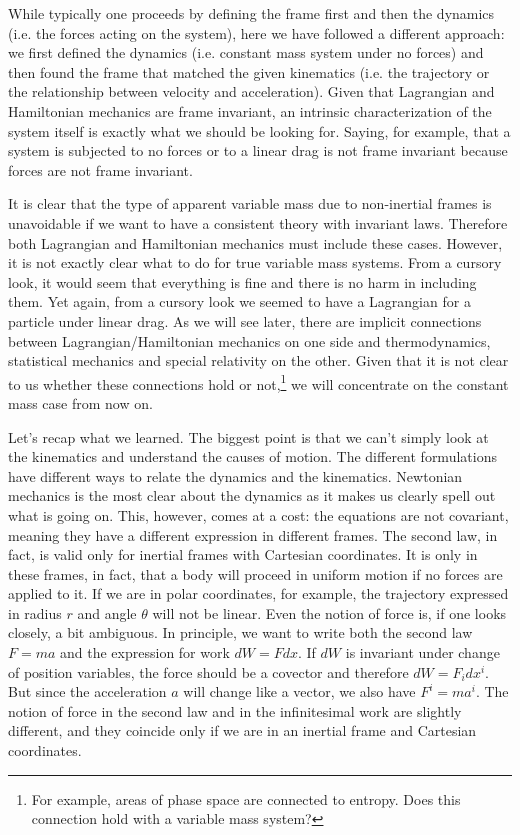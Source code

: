 While typically one proceeds by defining the frame first and then the dynamics (i.e. the forces acting on the system), here we have followed a different approach: we first defined the dynamics (i.e. constant mass system under no forces) and then found the frame that matched the given kinematics (i.e. the trajectory or the relationship between velocity and acceleration). Given that Lagrangian and Hamiltonian mechanics are frame invariant, an intrinsic characterization of the system itself is exactly what we should be looking for. Saying, for example, that a system is subjected to no forces or to a linear drag is not frame invariant because forces are not frame invariant.

It is clear that the type of apparent variable mass due to non-inertial frames is unavoidable if we want to have a consistent theory with invariant laws. Therefore both Lagrangian and Hamiltonian mechanics must include these cases. However, it is not exactly clear what to do for true variable mass systems. From a cursory look, it would seem that everything is fine and there is no harm in including them. Yet again, from a cursory look we seemed to have a Lagrangian for a particle under linear drag. As we will see later, there are implicit connections between Lagrangian/Hamiltonian mechanics on one side and thermodynamics, statistical mechanics and special relativity on the other. Given that it is not clear to us whether these connections hold or not,\footnote{For example, areas of phase space are connected to entropy. Does this connection hold with a variable mass system?} we will concentrate on the constant mass case from now on.

Let's recap what we learned. The biggest point is that we can't simply look at the kinematics and understand the causes of motion. The different formulations have different ways to relate the dynamics and the kinematics. Newtonian mechanics is the most clear about the dynamics as it makes us clearly spell out what is going on. This, however, comes at a cost: the equations are not covariant, meaning they have a different expression in different frames. The second law, in fact, is valid only for inertial frames with Cartesian coordinates. It is only in these frames, in fact, that a body will proceed in uniform motion if no forces are applied to it. If we are in polar coordinates, for example, the trajectory expressed in radius $r$ and angle $\theta$ will not be linear. Even the notion of force is, if one looks closely, a bit ambiguous. In principle, we want to write both the second law $F=ma$ and the expression for work $dW = F dx$. If $dW$ is invariant under change of position variables, the force should be a covector and therefore $dW = F_i dx^i$. But since the acceleration $a$ will change like a vector, we also have $F^i = m a^i$. The notion of force in the second law and in the infinitesimal work are slightly different, and they coincide only if we are in an inertial frame and Cartesian coordinates.

